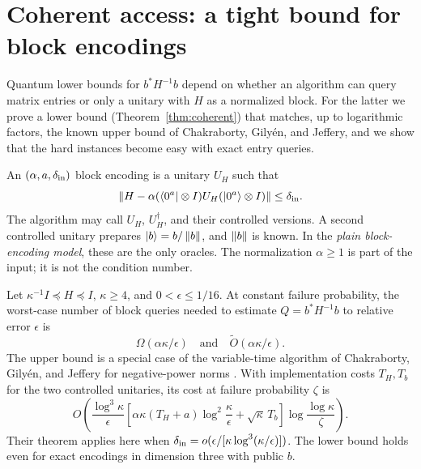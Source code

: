 \section{Coherent access: a tight bound for block encodings}\label{sec:coherent}

Quantum lower bounds for $b^*H^{-1}b$ depend on whether an algorithm can
query matrix entries or only a unitary with $H$ as a normalized block.
For the latter we prove a lower bound (Theorem~\ref{thm:coherent}) that
matches, up to logarithmic factors, the known upper bound of Chakraborty,
Gily\'en, and Jeffery, and we show that
the hard instances become easy with exact entry queries.

An $(\alpha,a,\delta_{\rm in})$ block encoding is a unitary $U_H$ such that
\[
 \left\lVert H-\alpha(\langle0^a|\otimes I)U_H(|0^a\rangle\otimes I)\right\rVert
 \leq\delta_{\rm in}.
\]
The algorithm may call $U_H$, $U_H^\dagger$, and their controlled
versions.  A second controlled unitary prepares $|b\rangle=b/\left\lVert b\right\rVert$, and
$\left\lVert b\right\rVert$ is known.  In the \emph{plain block-encoding model}, these are
the only oracles.  The
normalization $\alpha\geq1$ is part of the input; it is not the
condition number.

\begin{theorem}\label{thm:coherent}
Let $\kappa^{-1}I\preceq H\preceq I$, $\kappa\geq4$, and
$0<\epsilon\leq1/16$.  At constant failure probability, the worst-case
number of block queries needed to estimate $Q=b^*H^{-1}b$ to relative
error $\epsilon$ is
\[
 \Omega(\alpha\kappa/\epsilon)
 \quad\text{and}\quad
 \widetilde O(\alpha\kappa/\epsilon).
\]
The upper bound is a special case of the variable-time algorithm of
Chakraborty, Gily\'en, and Jeffery for negative-power norms
\citep[Theorem 33 in the full version]{ChakrabortyGilyenJeffery2019}.
With implementation costs $T_H,T_b$ for the two controlled
unitaries, its cost at failure probability $\zeta$ is
\begin{equation}\label{eq:cgj-cost}
 O\!\left(\frac{\log^3\kappa}{\epsilon}
 \left[\alpha\kappa(T_H+a)\log^2\frac\kappa\epsilon
       +\sqrt\kappa\,T_b\right]
 \log\frac{\log\kappa}{\zeta}\right).
\end{equation}
Their theorem applies here when
$\delta_{\rm in}=o(\epsilon/[\kappa\log^3(\kappa/\epsilon)])$.
The lower bound holds even for exact encodings in dimension three with
public $b$.
\end{theorem}


